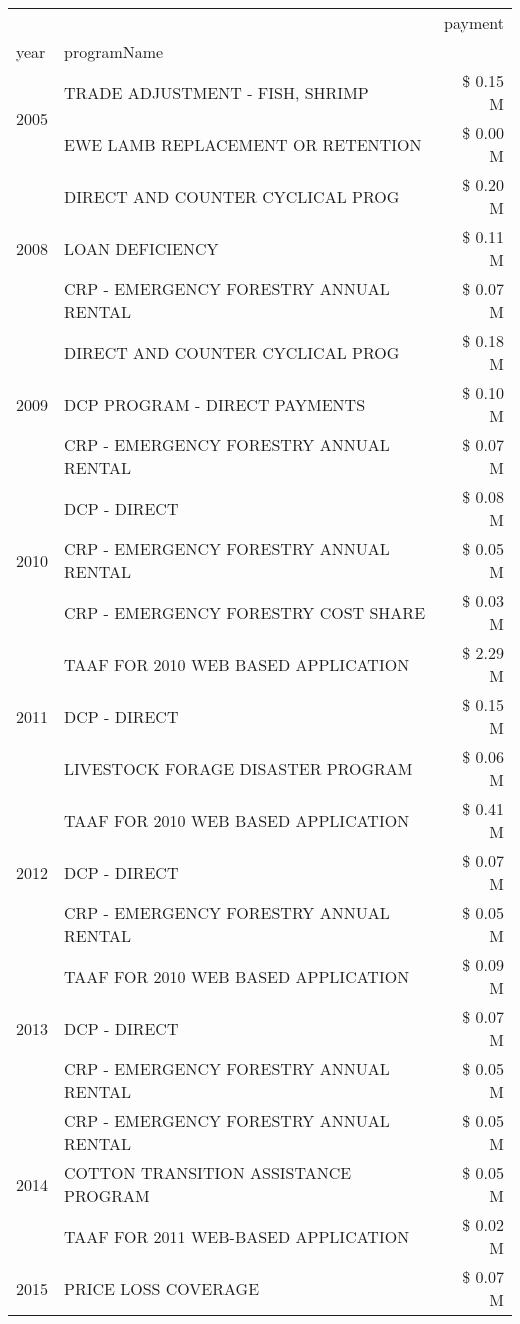 \begin{tabular}{llr}
\toprule
 &  & payment \\
year & programName &  \\
\midrule
\multirow[t]{2}{*}{2005} & TRADE ADJUSTMENT - FISH, SHRIMP & \$ 0.15 M \\
 & EWE LAMB REPLACEMENT OR RETENTION & \$ 0.00 M \\
\cline{1-3}
\multirow[t]{3}{*}{2008} & DIRECT AND COUNTER CYCLICAL PROG & \$ 0.20 M \\
 & LOAN DEFICIENCY & \$ 0.11 M \\
 & CRP - EMERGENCY FORESTRY ANNUAL RENTAL & \$ 0.07 M \\
\cline{1-3}
\multirow[t]{3}{*}{2009} & DIRECT AND COUNTER CYCLICAL PROG & \$ 0.18 M \\
 & DCP PROGRAM - DIRECT PAYMENTS & \$ 0.10 M \\
 & CRP - EMERGENCY FORESTRY ANNUAL RENTAL & \$ 0.07 M \\
\cline{1-3}
\multirow[t]{3}{*}{2010} & DCP - DIRECT & \$ 0.08 M \\
 & CRP - EMERGENCY FORESTRY ANNUAL RENTAL & \$ 0.05 M \\
 & CRP - EMERGENCY FORESTRY COST SHARE & \$ 0.03 M \\
\cline{1-3}
\multirow[t]{3}{*}{2011} & TAAF FOR 2010 WEB BASED APPLICATION & \$ 2.29 M \\
 & DCP - DIRECT & \$ 0.15 M \\
 & LIVESTOCK FORAGE DISASTER PROGRAM & \$ 0.06 M \\
\cline{1-3}
\multirow[t]{3}{*}{2012} & TAAF FOR 2010 WEB BASED APPLICATION & \$ 0.41 M \\
 & DCP - DIRECT & \$ 0.07 M \\
 & CRP - EMERGENCY FORESTRY ANNUAL RENTAL & \$ 0.05 M \\
\cline{1-3}
\multirow[t]{3}{*}{2013} & TAAF FOR 2010 WEB BASED APPLICATION & \$ 0.09 M \\
 & DCP - DIRECT & \$ 0.07 M \\
 & CRP - EMERGENCY FORESTRY ANNUAL RENTAL & \$ 0.05 M \\
\cline{1-3}
\multirow[t]{3}{*}{2014} & CRP - EMERGENCY FORESTRY ANNUAL RENTAL & \$ 0.05 M \\
 & COTTON TRANSITION ASSISTANCE PROGRAM & \$ 0.05 M \\
 & TAAF FOR 2011 WEB-BASED APPLICATION & \$ 0.02 M \\
\cline{1-3}
\multirow[t]{2}{*}{2015} & PRICE LOSS COVERAGE & \$ 0.07 M \\

\end{tabular}
